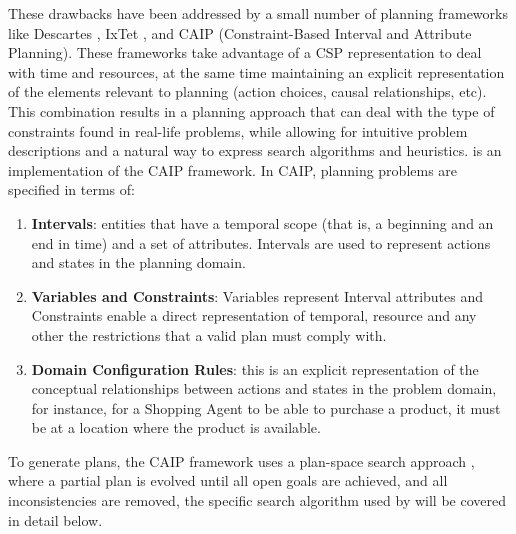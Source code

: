 These drawbacks have been addressed by a small number of planning frameworks like Descartes , IxTet , and CAIP (Constraint-Based Interval and Attribute Planning)\cite{mus94,frank2003}.
These frameworks take advantage of a CSP representation to deal with time and resources, at the same time maintaining an explicit representation of the elements relevant to planning (action choices, causal relationships, etc). This combination results in a planning approach that can deal with the type of constraints found in real-life problems, while allowing for intuitive problem descriptions and a natural way to express search algorithms and heuristics. \eu is an implementation of the CAIP framework. In CAIP, planning problems are specified in terms of:

\begin{enumerate}
	\item \textbf{Intervals}: entities that have a temporal scope (that is, a beginning and an  end in time) and a set of attributes. Intervals are used to represent actions and states in the planning domain. 
	\item \textbf{Variables and Constraints}: Variables represent Interval attributes and Constraints enable a direct representation of temporal, resource and any other the restrictions that a valid plan must comply with.
	\item \textbf{Domain Configuration Rules}: this is an explicit representation of the conceptual relationships between actions and states in the problem domain, for instance, for a Shopping Agent to be able to purchase a product, it must be at a location where the product is available.
\end{enumerate}

To generate plans, the CAIP framework uses a plan-space search approach , where a partial plan is evolved until all open goals are achieved, and all inconsistencies are removed, the specific search algorithm used by \eu will be covered in detail below.

